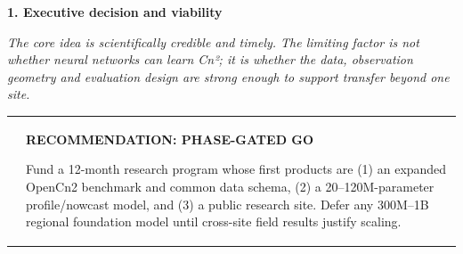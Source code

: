 \documentclass[
]{article}
\begin{document}
\textbf{1. Executive decision and viability}

\emph{The core idea is scientifically credible and timely. The limiting
factor is not whether neural networks can learn Cn²; it is whether the
data, observation geometry and evaluation design are strong enough to
support transfer beyond one site.}

\begin{longtable}[]{@{}
  >{\raggedright\arraybackslash}p{}
  >{\raggedright\arraybackslash}p{}@{}}
\toprule\noalign{}
\endhead
\bottomrule\noalign{}
\endlastfoot
& \textbf{RECOMMENDATION: PHASE-GATED GO}

Fund a 12-month research program whose first products are (1) an
expanded OpenCn2 benchmark and common data schema, (2) a
20--120M-parameter profile/nowcast model, and (3) a public research
site. Defer any 300M--1B regional foundation model until cross-site
field results justify scaling. \\
\end{longtable}
\end{document}

